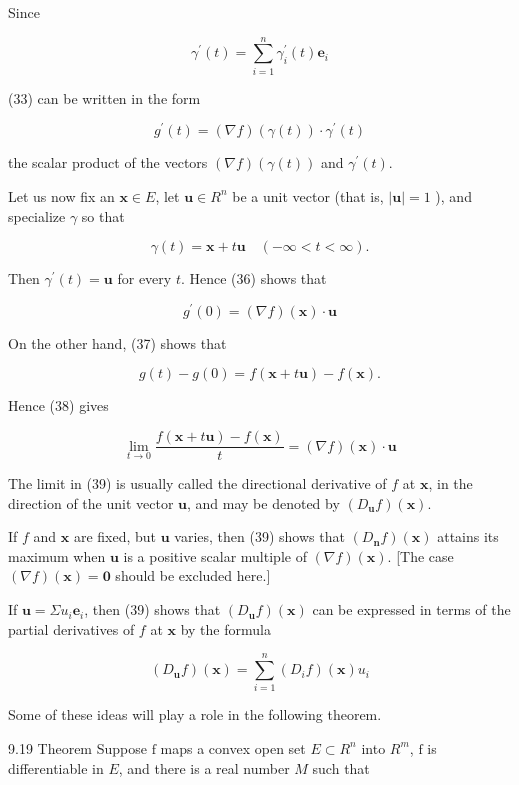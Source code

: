 \documentclass[10pt]{article}
\begin{document}
Since

$$
\gamma^{\prime}(t)=\sum_{i=1}^{n} \gamma_{i}^{\prime}(t) \mathbf{e}_{i}
$$

(33) can be written in the form

$$
g^{\prime}(t)=(\nabla f)(\gamma(t)) \cdot \gamma^{\prime}(t)
$$

the scalar product of the vectors $(\nabla f)(\gamma(t))$ and $\gamma^{\prime}(t)$.

Let us now fix an $\mathbf{x} \in E$, let $\mathbf{u} \in R^{n}$ be a unit vector (that is, $|\mathbf{u}|=1$ ), and specialize $\gamma$ so that

$$
\gamma(t)=\mathbf{x}+t \mathbf{u} \quad(-\infty<t<\infty) .
$$

Then $\gamma^{\prime}(t)=\mathbf{u}$ for every $t$. Hence (36) shows that

$$
g^{\prime}(0)=(\nabla f)(\mathbf{x}) \cdot \mathbf{u}
$$

On the other hand, (37) shows that

$$
g(t)-g(0)=f(\mathbf{x}+t \mathbf{u})-f(\mathbf{x}) .
$$

Hence (38) gives

$$
\lim _{t \rightarrow 0} \frac{f(\mathbf{x}+t \mathbf{u})-f(\mathbf{x})}{t}=(\nabla f)(\mathbf{x}) \cdot \mathbf{u}
$$

The limit in (39) is usually called the directional derivative of $f$ at $\mathbf{x}$, in the direction of the unit vector $\mathbf{u}$, and may be denoted by $\left(D_{\mathbf{u}} f\right)(\mathbf{x})$.

If $f$ and $\mathbf{x}$ are fixed, but $\mathbf{u}$ varies, then (39) shows that $\left(D_{\mathbf{n}} f\right)(\mathbf{x})$ attains its maximum when $\mathbf{u}$ is a positive scalar multiple of $(\nabla f)(\mathbf{x})$. [The case $(\nabla f)(\mathbf{x})=\mathbf{0}$ should be excluded here.]

If $\mathbf{u}=\Sigma u_{i} \mathbf{e}_{i}$, then (39) shows that $\left(D_{\mathbf{u}} f\right)(\mathbf{x})$ can be expressed in terms of the partial derivatives of $f$ at $\mathbf{x}$ by the formula

$$
\left(D_{\mathbf{u}} f\right)(\mathbf{x})=\sum_{i=1}^{n}\left(D_{i} f\right)(\mathbf{x}) u_{i}
$$

Some of these ideas will play a role in the following theorem.

9.19 Theorem Suppose $\mathrm{f}$ maps a convex open set $E \subset R^{n}$ into $R^{m}$, $\mathrm{f}$ is differentiable in $E$, and there is a real number $M$ such that
\end{document}
